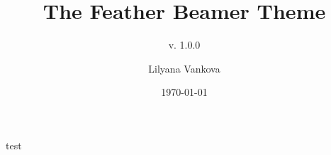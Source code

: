 \documentclass[10pt,
aspectratio=169
]{beamer}
\title{The Feather Beamer Theme}
\subtitle[The Feather Beamer Theme]{v. 1.0.0}
\author[Lilyana Vankova]{Lilyana Vankova}
\institute[]{Faculty of Mathematics, Informatics and Information}
\date{\today}
\begin{document}
\begin{frame}
test
\end{frame}
\end{document}
